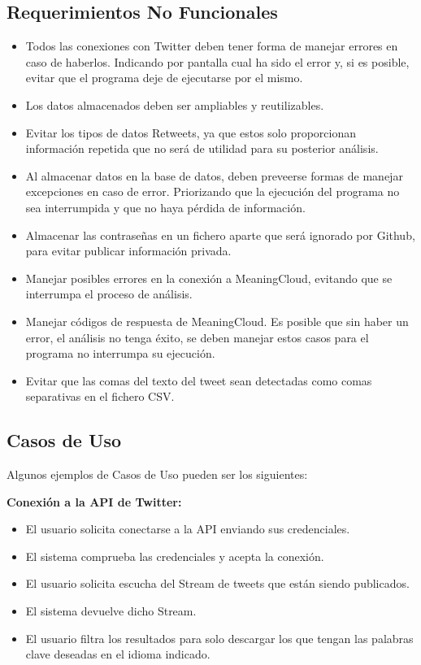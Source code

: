 \subsection{Requerimientos No Funcionales}

\begin{itemize}

	\item Todos las conexiones con Twitter deben tener forma de manejar errores en caso de haberlos. Indicando por pantalla cual ha sido el error y, si es posible, evitar que el programa deje de ejecutarse por el mismo. 
	\item Los datos almacenados deben ser ampliables y reutilizables. 
	\item Evitar los tipos de datos Retweets, ya que estos solo proporcionan información repetida que no será de utilidad para su posterior análisis.
	\item Al almacenar datos en la base de datos, deben preveerse formas de manejar excepciones en caso de error. Priorizando que la ejecución del programa no sea interrumpida y que no haya pérdida de información. 
	
	\item Almacenar las contraseñas en un fichero aparte que será ignorado por Github, para evitar publicar información privada.
	
	\item Manejar posibles errores en la conexión a MeaningCloud, evitando que se interrumpa el proceso de análisis. 
	
	\item Manejar códigos de respuesta de MeaningCloud. Es posible que sin haber un error, el análisis no tenga éxito, se deben manejar estos casos para el programa no interrumpa su ejecución. 
	
	\item Evitar que las comas del texto del tweet sean detectadas como comas separativas en el fichero CSV.
	
	
	
	
	
\end{itemize}



\subsection{Casos de Uso}
Algunos ejemplos de Casos de Uso pueden ser los siguientes: 

\textbf{Conexión a la API de Twitter:}
\begin{itemize}
	\item El usuario solicita conectarse a la API enviando sus credenciales.
	\item El sistema comprueba las credenciales y acepta la conexión. 
	\item El usuario solicita escucha del Stream de tweets que están siendo publicados. 
	\item El sistema devuelve dicho Stream. 
	\item El usuario filtra los resultados para solo descargar los que tengan las palabras clave deseadas en el idioma indicado. 
\end{itemize}



